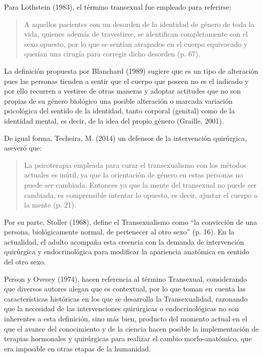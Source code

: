 Para Lothstein (1983), el término transexual fue empleado para referirse:

\begin{quote}
    A aquellos pacientes con un desorden de la identidad de género de toda la
    vida, quienes además de travestirse, se identifican completamente con el sexo
    opuesto, por lo que se sentían atrapados en el cuerpo equivocado y querían una
    cirugía para corregir dicho desorden (p. 67).
\end{quote}

La definición propuesta por Blanchard (1989) sugiere que es un tipo de
alteración pues las personas tienden a sentir que el cuerpo que poseen no es el
indicado y por ello recurren a vestirse de otras maneras y adoptar actitudes que
no son propias de su género biológico una posible alteración o marcada variación
psicológica del sentido de la identidad, tanto corporal (genital) como de la
identidad mental, es decir, de la idea del propio género (Graille, 2001).

De igual forma, Techeira, M. (2014) un defensor de la intervención quirúrgica,
aseveró que:

\begin{quote}
    La psicoterapia empleada para curar el transexualismo con los métodos
    actuales es inútil, ya que la orientación de género en estas personas no puede
    ser cambiada.
    Entonces ya que la mente del transexual no puede ser cambiada, es comprensible
    intentar lo opuesto, es decir, ajustar el cuerpo a la mente (p. 21).
\end{quote}

Por su parte, Stoller (1968), define el Transexualismo como “la convicción de
una persona, biológicamente normal, de pertenecer al otro sexo” (p. 16).
En la actualidad, el adulto acompaña esta creencia con la demanda de
intervención quirúrgica y endocrinológica para modificar la apariencia anatómica
en sentido del otro sexo.

Person y Ovesey (1974), hacen referencia al término Transexual, considerando que
diversos autores alegan que es contextual, por lo que toman en cuenta las
características históricas en los que se desarrolla la Transexualidad, razonando
que la necesidad de las intervenciones quirúrgicas o endocrinológicas no son
inherentes a esta definición, sino más bien, producto del momento actual en el
que el avance del conocimiento y de la ciencia hacen posible la implementación
de terapias hormonales y quirúrgicas para realizar el cambio morfo-anatómico,
que era imposible en otras etapas de la humanidad.

